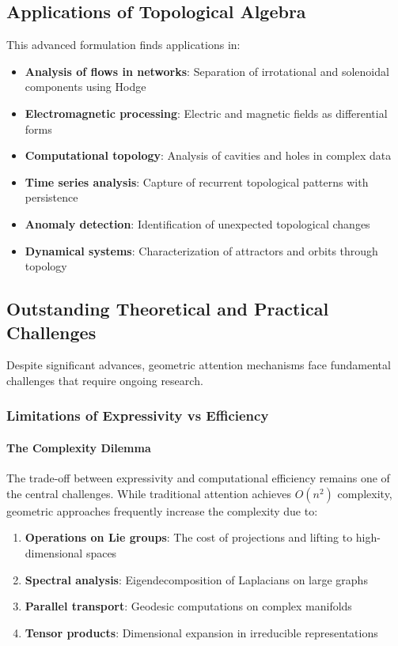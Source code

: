 \subsection{Applications of Topological Algebra}

This advanced formulation finds applications in:

\begin{itemize}
    \item \textbf{Analysis of flows in networks}: Separation of irrotational and solenoidal components using Hodge
    \item \textbf{Electromagnetic processing}: Electric and magnetic fields as differential forms
    \item \textbf{Computational topology}: Analysis of cavities and holes in complex data
    \item \textbf{Time series analysis}: Capture of recurrent topological patterns with persistence
    \item \textbf{Anomaly detection}: Identification of unexpected topological changes
    \item \textbf{Dynamical systems}: Characterization of attractors and orbits through topology
\end{itemize}


\subsection{Outstanding Theoretical and Practical Challenges}

Despite significant advances, geometric attention mechanisms face fundamental challenges that require ongoing research.

\subsubsection{Limitations of Expressivity vs Efficiency}

\paragraph{The Complexity Dilemma}

The trade-off between expressivity and computational efficiency remains one of the central challenges. While traditional attention achieves $O(n^2)$ complexity, geometric approaches frequently increase the complexity due to:

\begin{enumerate}
    \item \textbf{Operations on Lie groups}: The cost of projections and lifting to high-dimensional spaces
    \item \textbf{Spectral analysis}: Eigendecomposition of Laplacians on large graphs
    \item \textbf{Parallel transport}: Geodesic computations on complex manifolds
    \item \textbf{Tensor products}: Dimensional expansion in irreducible representations
\end{enumerate}

